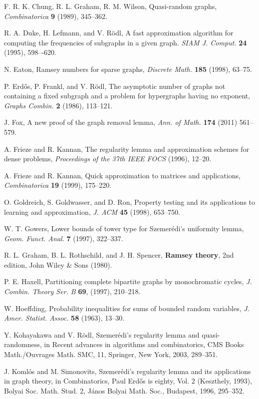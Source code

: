\documentclass[11pt]{article}
\begin{document}
\begin{thebibliography}{}
F. R. K. Chung, R. L. Graham, R. M. Wilson, Quasi-random graphs, {\it
Combinatorica} {\bf 9} (1989), 345--362.

R. A. Duke,  H. Lefmann, and V. R\"odl, A fast approximation algorithm for
computing the frequencies of subgraphs in a given graph. {\it SIAM J. Comput.}
{\bf 24} (1995), 598–-620.

N. Eaton, Ramsey numbers for sparse graphs, {\it Discrete Math.} {\bf 185}
(1998), 63--75.

P. Erd\H{o}s, P. Frankl, and  V. R\"odl, The asymptotic number of graphs not
containing a fixed subgraph and a problem for hypergraphs having no exponent,
{\it Graphs Combin.} {\bf 2} (1986), 113--121.

J. Fox, A new proof of the graph removal lemma, {\it Ann. of Math.} {\bf 174} (2011) 561--579.

A. Frieze and R. Kannan, The regularity lemma and approximation schemes for
dense problems, {\it Proceedings of the 37th IEEE FOCS} (1996), 12--20.

A. Frieze and R. Kannan, Quick approximation to matrices and applications, {\it
Combinatorica} {\bf 19} (1999), 175--220.

O. Goldreich, S. Goldwasser, and D. Ron, Property testing and its applications
to learning and approximation, {\it J. ACM} {\bf 45} (1998), 653--750.

 W. T. Gowers, Lower bounds of tower type for Szemer\'edi's
uniformity lemma, {\it Geom. Funct. Anal.} {\bf 7} (1997), 322--337.

R. L. Graham, B. L. Rothschild, and J. H. Spencer, {\bf Ramsey theory}, 2nd
edition, John Wiley \& Sons (1980).

P. E. Haxell, Partitioning complete bipartite graphs by monochromatic cycles,
{\it J. Combin. Theory Ser. B} {\bf 69}, (1997), 210--218.

W. Hoeffding, Probability inequalities for sums of bounded random variables,
{\it J. Amer. Statist. Assoc.} {\bf 58} (1963),  13--30.


 Y. Kohayakawa and V. R\"odl, Szemer\'edi's regularity lemma and
quasi-randomness, in Recent advances in algorithms and combinatorics,
CMS Books Math./Ouvrages Math. SMC, 11, Springer, New York, 2003, 289--351.

 J. Koml\'os and M. Simonovits, Szemer\'edi's regularity lemma
and its applications in graph theory, in Combinatorics, Paul Erd\H{o}s is
eighty, Vol. 2 (Keszthely, 1993), Bolyai Soc. Math. Stud. 2, J\'anos
Bolyai Math. Soc., Budapest, 1996, 295--352.


\end{thebibliography}
\end{document}
